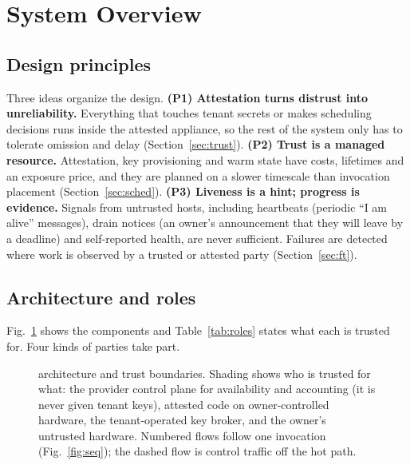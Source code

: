 \section{System Overview}
\label{sec:overview}

\subsection{Design principles}
Three ideas organize the design.
\textbf{(P1) Attestation turns distrust into unreliability.} Everything that touches tenant secrets or makes scheduling
decisions runs inside the attested appliance, so the rest of the system only has to tolerate omission and delay
(Section~\ref{sec:trust}).
\textbf{(P2) Trust is a managed resource.} Attestation, key provisioning and warm state have costs, lifetimes and an
exposure price, and they are planned on a slower timescale than invocation placement (Section~\ref{sec:sched}).
\textbf{(P3) Liveness is a hint; progress is evidence.} Signals from untrusted hosts, including heartbeats (periodic ``I am alive'' messages), drain notices
(an owner's announcement that they will leave by a deadline) and self-reported health, are never sufficient. Failures are detected where work is observed by a trusted or attested party
(Section~\ref{sec:ft}).

\subsection{Architecture and roles}
Fig.~\ref{fig:arch} shows the components and Table~\ref{tab:roles} states what each is trusted for. Four kinds of
parties take part.

\begin{figure}[t]
\centering
\resizebox{\textwidth}{!}{}
\caption{\voss{} architecture and trust boundaries. Shading shows who is trusted for what: the provider control plane for availability and
accounting (it is never given tenant keys), attested code on owner-controlled hardware, the tenant-operated key broker, and the owner's untrusted
hardware. Numbered flows follow one invocation (Fig.~\ref{fig:seq}); the dashed flow is control traffic off the hot path.}
\label{fig:arch}
\end{figure}

